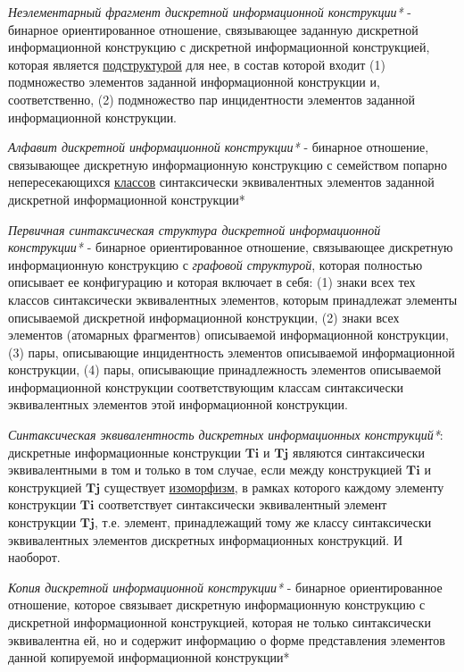 \textit{Неэлементарный фрагмент дискретной информационной конструкции*} - бинарное ориентированное отношение, связывающее заданную дискретной информационной конструкцию с дискретной информационной конструкцией, которая является \underline{подструктурой} для нее, в состав которой входит (1) подмножество элементов заданной информационной конструкции и, соответственно, (2) подмножество пар инцидентности элементов заданной информационной конструкции.

\textit{Алфавит дискретной информационной конструкции*} - бинарное отношение, связывающее дискретную информационную конструкцию с семейством попарно непересекающихся \underline{классов} синтаксически эквивалентных элементов заданной дискретной информационной конструкции*

\textit{Первичная синтаксическая структура дискретной информационной конструкции*} - бинарное ориентированное отношение, связывающее дискретную информационную конструкцию с \textit{графовой структурой}, которая полностью описывает ее конфигурацию и которая включает в себя: (1) знаки всех тех классов синтаксически эквивалентных элементов, которым принадлежат элементы описываемой дискретной информационной конструкции, (2) знаки всех элементов (атомарных фрагментов) описываемой информационной конструкции, (3) пары, описывающие инцидентность элементов описываемой информационной конструкции, (4) пары, описывающие принадлежность элементов описываемой информационной конструкции соответствующим классам синтаксически эквивалентных элементов этой информационной конструкции.

\textit{Синтаксическая эквивалентность дискретных информационных конструкций*}: дискретные информационные конструкции $\bm{Ti}$ и $\bm{Tj}$ являются синтаксически эквивалентными в том и только в том случае, если между конструкцией $\bm{Ti}$ и конструкцией $\bm{Tj}$ существует \underline{изоморфизм}, в рамках которого каждому элементу конструкции $\bm{Ti}$ соответствует синтаксически эквивалентный элемент конструкции $\bm{Tj}$, т.е. элемент, принадлежащий тому же классу синтаксически эквивалентных элементов дискретных информационных конструкций. И наоборот.

\textit{Копия дискретной информационной конструкции*} - бинарное ориентированное отношение, которое связывает дискретную информационную конструкцию с дискретной информационной конструкцией, которая не только синтаксически эквивалентна ей, но и содержит информацию о форме представления элементов данной копируемой информационной конструкции*


